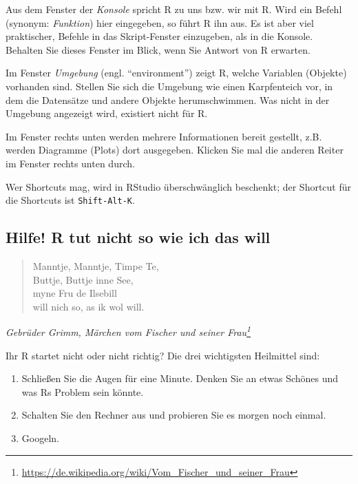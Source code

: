 \documentclass[12pt,ngerman,]{book}
\providecommand{\tightlist}{%
  \setlength{\itemsep}{0pt}\setlength{\parskip}{0pt}}
\let\rmarkdownfootnote\footnote%
\def\footnote{\protect\rmarkdownfootnote}
\begin{document}
Aus dem Fenster der \emph{Konsole} spricht R zu uns bzw.
wir mit R. Wird ein Befehl (synonym:
\emph{Funktion}) hier eingegeben, so führt R ihn aus. Es
ist aber viel praktischer, Befehle in das Skript-Fenster einzugeben, als
in die Konsole. Behalten Sie dieses Fenster im Blick, wenn Sie Antwort
von R erwarten.

Im Fenster \emph{Umgebung} (engl. ``environment'') zeigt
R, welche Variablen (Objekte) vorhanden sind. Stellen Sie sich die
Umgebung wie einen Karpfenteich vor, in dem die Datensätze und andere
Objekte herumschwimmen. Was nicht in der Umgebung angezeigt wird,
existiert nicht für R.

Im Fenster rechts unten werden mehrere Informationen bereit gestellt,
z.B. werden Diagramme (Plots) dort ausgegeben. Klicken Sie mal die
anderen Reiter im Fenster rechts unten durch.

Wer Shortcuts mag, wird in RStudio überschwänglich beschenkt; der
Shortcut für die Shortcuts ist \texttt{Shift-Alt-K}.

\subsection{Hilfe! R tut nicht so wie ich das
will}\label{hilfe-r-tut-nicht-so-wie-ich-das-will}

\begin{quote}
Manntje, Manntje, Timpe Te,\\
Buttje, Buttje inne See,\\
myne Fru de Ilsebill\\
will nich so, as ik wol will.
\end{quote}

\emph{Gebrüder Grimm, Märchen vom Fischer und seiner Frau\footnote{\url{https://de.wikipedia.org/wiki/Vom_Fischer_und_seiner_Frau}}}

Ihr R startet nicht oder nicht richtig? Die drei wichtigsten Heilmittel
sind:

\begin{enumerate}
\def\labelenumi{\arabic{enumi}.}
\tightlist
\item
  Schließen Sie die Augen für eine Minute. Denken Sie an etwas Schönes
  und was Rs Problem sein könnte.
\item
  Schalten Sie den Rechner aus und probieren Sie es morgen noch einmal.
\item
  Googeln.
\end{enumerate}
\end{document}
